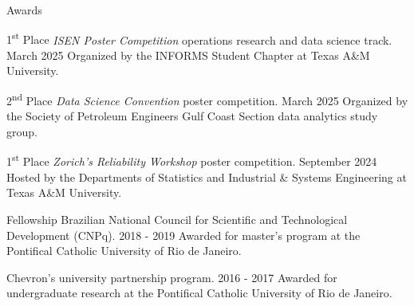 \begin{cvcontentsection}{Awards}

\cvaward
    {1\textsuperscript{st} Place}
    {\textit{ISEN Poster Competition} operations research and data science track.}
    {March 2025}
    {Organized by the INFORMS Student Chapter at Texas A\&M University.}

\cvaward
    {2\textsuperscript{nd} Place}
    {\textit{Data Science Convention} poster competition.}
    {March 2025}
    {Organized by the Society of Petroleum Engineers Gulf Coast Section data analytics study group.}

\cvaward
    {1\textsuperscript{st} Place}
    {\textit{Zorich's Reliability Workshop} poster competition.}
    {September 2024}
    {Hosted by the Departments of Statistics and Industrial \& Systems Engineering at Texas A\&M University.}

\cvaward
    {Fellowship}
    {Brazilian National Council for Scientific and Technological Development (CNPq).}
    {2018 - 2019}
    {Awarded for master's program at the Pontifical Catholic University of Rio de Janeiro.}

    {Chevron's university partnership program.}
    {2016 - 2017}
    {Awarded for undergraduate research at the Pontifical Catholic University of Rio de Janeiro.}

\end{cvcontentsection}
